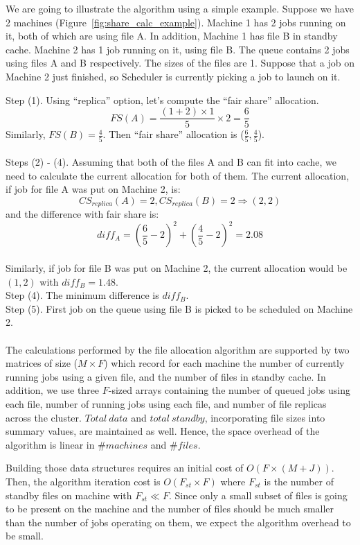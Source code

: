 We are going to illustrate the algorithm using a simple example. Suppose we have 2 machines (Figure~\ref{fig:share_calc_example}). Machine 1 has 2 jobs running on it, both of which are using file A. In addition, Machine 1 has file B in standby cache. Machine 2 has 1 job running on it, using file B. The queue contains 2 jobs using files A and B respectively. The sizes of the files are 1. Suppose that a job on Machine 2 just finished, so Scheduler is currently picking a job to launch on it.

Step (1). Using ``replica'' option, let's compute the ``fair share'' allocation.
$$FS(A) = \frac{(1 + 2)\times 1}{5}\times 2 = \frac{6}{5}$$
Similarly, $FS(B) = \frac{4}{5}$. Then ``fair share'' allocation is ($\frac{6}{5},\frac{4}{5}$). \\ \\
Steps (2) - (4). Assuming that both of the files A and B can fit into cache, we need to calculate the current allocation for both of them. The current allocation, if job for file A was put on Machine 2, is:
$$CS_{replica}(A) = 2, CS_{replica}(B) = 2 \Rightarrow (2, 2)$$
and the difference with fair share is:
$$ diff_A = (\frac{6}{5} - 2)^2 + (\frac{4}{5} - 2)^2 = 2.08$$ \\
Similarly, if job for file B was put on Machine 2, the current allocation would be $(1, 2)$ with $diff_B = 1.48$. \\
Step (4). The minimum difference is $diff_B$.\\
Step (5). First job on the queue using file B is picked to be scheduled on Machine 2.\\ \\
The calculations performed by the file allocation algorithm are supported by two matrices of size ($M \times F$) which record for each machine the number of currently running jobs using a given file, and the number of files in standby cache. In addition, we use three $F$-sized arrays containing the number of queued jobs using each file, number of running jobs using each file, and number of file replicas across the cluster. $Total\ data$ and $total\ standby$, incorporating file sizes into summary values, are maintained as well. Hence, the space overhead of the algorithm is linear in $\# machines$ and $\# files$. 

Building those data structures requires an initial cost of $O(F \times (M + J))$. Then, the algorithm iteration cost is $O(F_{st}\times F)$ where $F_{st}$ is the number of standby files on machine with $F_{st} \ll F$. Since only a small subset of files is going to be present on the machine and the number of files should be much smaller than the number of jobs operating on them, we expect the algorithm overhead to be small.

